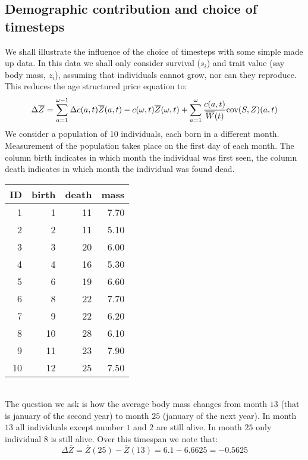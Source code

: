 \subsection{Demographic contribution and choice of timesteps}\label{app:ape:step}
We shall illustrate the influence of the choice of timesteps with some simple made up data. In this data we shall only consider survival ($s_i$) and trait value (say body mass, $z_i$), assuming that individuals cannot grow, nor can they reproduce. This reduces the age structured price equation to:
\begin{equation}
\Delta \overline{Z} = \sum_{a=1}^{\omega-1} \Delta c(a,t)\overline{Z}(a,t) - c(\omega,t) \overline{Z}(\omega,t) + \sum_{a=1}^{\omega} \frac{c(a,t)}{\overline{W}(t)} \text{cov}(S,Z)(a,t)
\end{equation}
We consider a population of 10 individuals, each born in a different month. Measurement of the population takes place on the first day of each month. The column birth indicates in which month the individual was first seen, the column death indicates in which month the individual was found dead. \\
\begin{tabular}{rrrr}
  \hline
ID & birth & death & mass \\ 
  \hline
1 &   1 &  11 & 7.70 \\ 
  2 &   2 &  11 & 5.10 \\ 
  3 &   3 &  20 & 6.00 \\ 
  4 &   4 &  16 & 5.30 \\ 
  5 &   6 &  19 & 6.60 \\ 
  6 &   8 &  22 & 7.70 \\ 
  7 &   9 &  22 & 6.20 \\ 
  8 &  10 &  28 & 6.10 \\ 
  9 &  11 &  23 & 7.90 \\ 
  10 &  12 &  25 & 7.50 \\ 
   \hline
\end{tabular} \\
The question we ask is how the average body mass changes from month $13$ (that is january of the second year) to month $25$ (january of the next year). In month $13$ all individuals except number $1$ and $2$ are still alive. In month $25$ only individual $8$ is still alive. Over this timespan we note that:
\begin{equation}
\Delta \overline{Z} = \overline{Z}(25) - \overline{Z}(13) = 6.1 - 6.6625 = - 0.5625
\end{equation}
